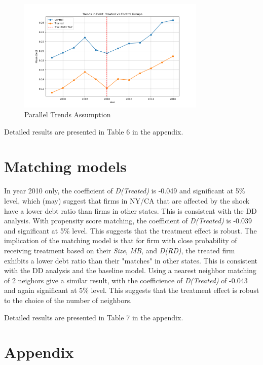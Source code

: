 \documentclass{article}
\begin{document}
\begin{figure}[h!]
    \centering
    \includegraphics[width=0.8\textwidth]{parallel_trends.png}
    \caption{Parallel Trends Assumption}
    \label{fig:parallel_trends}
\end{figure}

Detailed results are presented in Table 6 in the appendix.

\section*{Matching models}
In year 2010 only, the coefficient of \textit{D(Treated)} is -0.049 and significant at 5\% level, which (may) suggest that
firms in NY/CA that are affected by the shock have a lower debt ratio than firms in other states. This is consistent with the DD analysis.
With propensity score matching, the coefficient of \textit{D(Treated)} is -0.039 and significant at 5\% level.
This suggests that the treatment effect is robust. The implication of the matching model is that for firm with close probability
of receiving treatment based on their \textit{Size}, \textit{MB}, and \textit{D(RD)}, the treated firm exhibits a lower debt ratio
than their "matches" in other states. This is consistent with the DD analysis and the baseline model.
Using a nearest neighbor matching of 2 neighors give a similar result, with the coefficience of \textit{D(Treated)} of -0.043
and again significant at 5\% level. This suggests that the treatment effect is robust to the choice of the number of neighbors.

Detailed results are presented in Table 7 in the appendix.

\section*{Appendix}
\end{document}
